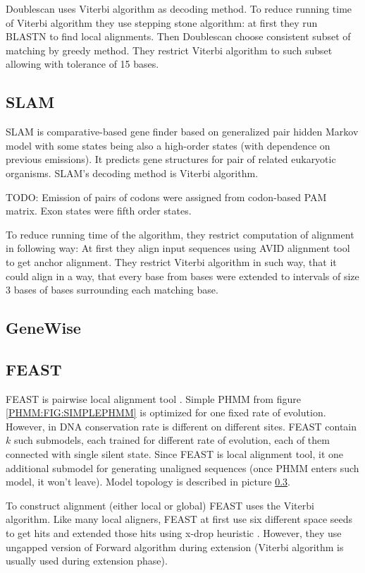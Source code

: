 Doublescan uses Viterbi algorithm as decoding method.  To reduce running time of
Viterbi algorithm they use stepping stone algorithm: at first they run BLASTN to
find local alignments. Then Doublescan choose consistent subset of matching by
greedy method. They restrict Viterbi algorithm to such subset allowing with
tolerance of 15 bases.

\subsection{SLAM}

SLAM is comparative-based gene finder \cite{SLAM2003} based on generalized pair
hidden Markov model \cite{Alexanderson2004} with some states being also a
high-order states (with dependence on previous emissions).  It predicts gene
structures for pair of related eukaryotic organisms. SLAM's decoding method is
Viterbi algorithm. 

TODO:
Emission of pairs of codons were assigned from codon-based PAM matrix. Exon
states were fifth order states.

To reduce running time of the algorithm, they restrict computation of alignment
in following way: At first they  align input sequences using AVID alignment
tool\cite{} to get anchor alignment. They restrict Viterbi algorithm in such way, that it could align  in a
way, that every base from  bases were extended to intervals of size $3$ bases of
bases surrounding each matching base.


\subsection{GeneWise}
\subsection{FEAST}
FEAST is pairwise local alignment tool \cite{FEAST2011}. Simple PHMM from figure
\ref{PHMM:FIG:SIMPLEPHMM} is optimized for one fixed rate of evolution. However,
in DNA conservation rate is different on different sites.  FEAST contain $k$
such submodels, each trained for different rate of evolution, each of them
connected with single silent state. Since FEAST is local alignment tool, it
one additional submodel for generating unaligned sequences (once PHMM enters
such model, it won't leave). Model topology is described in picture
\ref{}.

To construct alignment (either local or global) FEAST uses the Viterbi
algorithm. Like many local aligners, FEAST at first use six different space
seeds to get hits and extended those hits using x-drop heuristic \cite{}.
However, they use ungapped version of Forward algorithm during extension
(Viterbi algorithm is usually used during extension phase).

